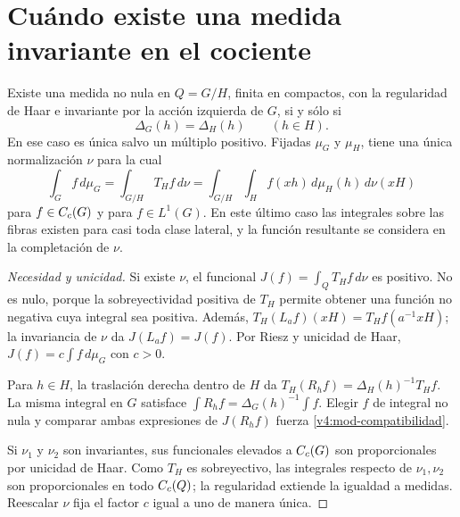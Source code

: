 \section{Cuándo existe una medida invariante en el cociente}
\begin{teorema}\label{v4:mod-weil}
Existe una medida no nula en $Q=G/H$, finita en compactos, con la regularidad de Haar e invariante por la acción izquierda de $G$, si y sólo si
\begin{equation}\label{v4:mod-compatibilidad}
 \Delta_G(h)=\Delta_H(h)\qquad(h\in H).
\end{equation}
En ese caso es única salvo un múltiplo positivo. Fijadas $\mu_G$ y $\mu_H$, tiene una única normalización $\nu$ para la cual
\begin{equation}\label{v4:mod-weil-formula}
 \int_G f\,d\mu_G=\int_{G/H}T_Hf\,d\nu
   =\int_{G/H}\int_H f(xh)\,d\mu_H(h)\,d\nu(xH)
\end{equation}
para $f\in C_c(G)$ y para $f\in L^1(G)$. En este último caso las integrales sobre las fibras existen para casi toda clase lateral, y la función resultante se considera en la completación de $\nu$.
\end{teorema}
\begin{proof}[Necesidad y unicidad]
Si existe $\nu$, el funcional $J(f)=\int_Q T_Hf\,d\nu$ es positivo. No es nulo, porque la sobreyectividad positiva de $T_H$ permite obtener una función no negativa cuya integral sea positiva. Además,
$T_H(L_af)(xH)=T_Hf(a^{-1}xH)$; la invariancia de $\nu$ da $J(L_af)=J(f)$. Por Riesz y unicidad de Haar, $J(f)=c\int f\,d\mu_G$ con $c>0$.

Para $h\in H$, la traslación derecha dentro de $H$ da
$T_H(R_hf)=\Delta_H(h)^{-1}T_Hf$. La misma integral en $G$ satisface
$\int R_hf=\Delta_G(h)^{-1}\int f$. Elegir $f$ de integral no nula y comparar ambas expresiones de $J(R_hf)$ fuerza \eqref{v4:mod-compatibilidad}.

Si $\nu_1$ y $\nu_2$ son invariantes, sus funcionales elevados a $C_c(G)$ son proporcionales por unicidad de Haar. Como $T_H$ es sobreyectivo, las integrales respecto de $\nu_1,\nu_2$ son proporcionales en todo $C_c(Q)$; la regularidad extiende la igualdad a medidas. Reescalar $\nu$ fija el factor $c$ igual a uno de manera única.
\end{proof}

